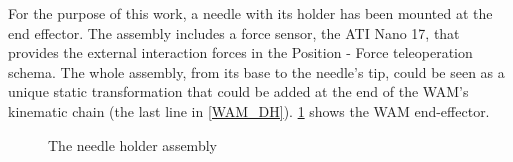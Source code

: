 For the purpose of this work, a needle with its holder has been mounted at the end effector.
The assembly includes a force sensor, the ATI Nano 17, that provides the external interaction forces in the Position - Force teleoperation schema.
The whole assembly, from its base to the needle's tip, could be seen as a unique static transformation that could be added at the end of the WAM's kinematic chain (the last line in \tablename{ \ref{WAM_DH}}).
\figurename{ \ref{fig:EE}} shows the WAM end-effector.
\begin{figure}
	\caption[The needle holder assembly]{The needle holder assembly}
	\label{fig:EE}
\end{figure}


